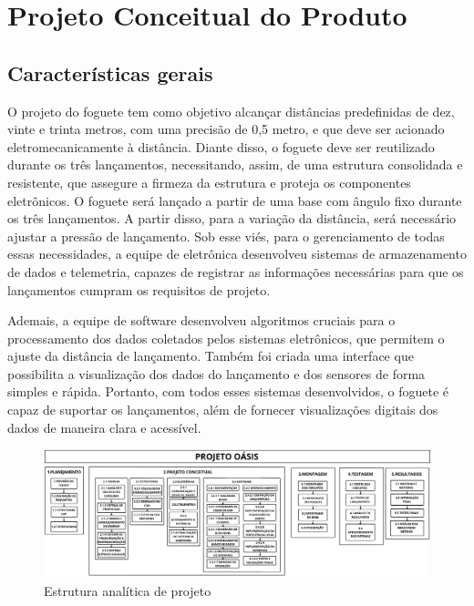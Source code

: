 \chapter{Projeto Conceitual do Produto}

\section{Características gerais}

 O projeto do foguete tem como objetivo alcançar distâncias predefinidas de dez, vinte e trinta metros, com uma precisão de 0,5 metro, e que deve ser acionado eletromecanicamente à distância. Diante disso, o foguete deve ser reutilizado durante os três lançamentos, necessitando, assim, de uma estrutura consolidada e resistente, que assegure a firmeza da estrutura e proteja os componentes eletrônicos. O foguete será lançado a partir de uma base com ângulo fixo durante os três lançamentos. A partir disso, para a variação da distância, será necessário ajustar a pressão de lançamento. Sob esse viés, para o gerenciamento de todas essas necessidades, a equipe de eletrônica desenvolveu sistemas de armazenamento de dados e telemetria, capazes de registrar as informações necessárias para que os lançamentos cumpram os requisitos de projeto.

Ademais, a equipe de software desenvolveu algoritmos cruciais para o processamento dos dados coletados pelos sistemas eletrônicos, que permitem o ajuste da distância de lançamento. Também foi criada uma interface que possibilita a visualização dos dados do lançamento e dos sensores de forma simples e rápida. Portanto, com todos esses sistemas desenvolvidos, o foguete é capaz de suportar os lançamentos, além de fornecer visualizações digitais dos dados de maneira clara e acessível.



\begin{landscape}

\begin{figure}
    \centering
    \includegraphics[width=1\linewidth]{figuras/EAP-corrigida.png}
    \caption{Estrutura analítica de projeto}
    \label{fig:enter-label}
\end{figure}

\end{landscape}

